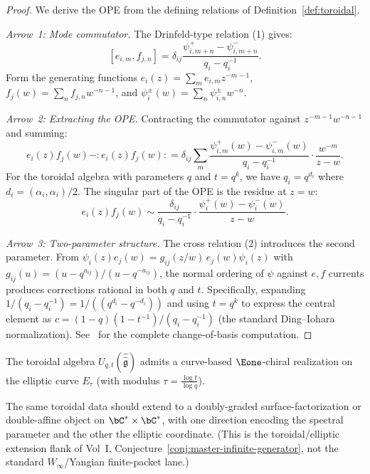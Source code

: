 \begin{proof}
We derive the OPE from the defining relations of Definition~\ref{def:toroidal}.

\emph{Arrow~1: Mode commutator.}
The Drinfeld-type relation (1) gives:
\[
[e_{i,m}, f_{j,n}] = \delta_{ij} \frac{\psi^+_{i,m+n} - \psi^-_{i,m+n}}{q_i - q_i^{-1}}.
\]
Form the generating functions $e_i(z) = \sum_m e_{i,m} z^{-m-1}$,
$f_j(w) = \sum_n f_{j,n} w^{-n-1}$, and
$\psi_i^\pm(w) = \sum_n \psi^\pm_{i,n} w^{-n}$.

\emph{Arrow~2: Extracting the OPE.}
Contracting the commutator against $z^{-m-1} w^{-n-1}$ and summing:
\[
e_i(z) f_j(w) - {:}e_i(z) f_j(w){:}
= \delta_{ij} \sum_{m} \frac{\psi^+_{i,m}(w) - \psi^-_{i,m}(w)}{q_i - q_i^{-1}} \cdot \frac{w^{-m}}{z - w}.
\]
For the toroidal algebra with parameters $q$ and $t = q^k$,
we have $q_i = q^{d_i}$ where $d_i = (\alpha_i, \alpha_i)/2$.
The singular part of the OPE is the residue at $z = w$:
\[
e_i(z) f_j(w) \sim \frac{\delta_{ij}}{q_i - q_i^{-1}} \cdot
\frac{\psi_i^+(w) - \psi_i^-(w)}{z - w}.
\]

\emph{Arrow~3: Two-parameter structure.}
The cross relation (2) introduces the second parameter.
From $\psi_i(z) e_j(w) = g_{ij}(z/w) \, e_j(w) \psi_i(z)$
with $g_{ij}(u) = (u - q^{a_{ij}})/(u - q^{-a_{ij}})$,
the normal ordering of $\psi$ against $e, f$ currents produces
corrections rational in both $q$ and $t$. Specifically, expanding
$1/(q_i - q_i^{-1}) = 1/((q^{d_i} - q^{-d_i}))$ and using
$t = q^k$ to express the central element as
$c = (1 - q)(1-t^{-1})/(q_i - q_i^{-1})$ (the standard Ding--Iohara
normalization). See~\cite{DI97} for the complete change-of-basis computation.
\end{proof}

\begin{conjecture}\label{conj:toroidal-e1}
\ClaimStatusConjectured
The toroidal algebra $U_{q,t}(\hat{\hat{\mathfrak{g}}})$ admits a
curve-based $\Eone$-chiral realization on the elliptic curve
$E_\tau$ (with modulus $\tau = \frac{\log t}{\log q}$).
\end{conjecture}

\begin{conjecture}
\label{conj:toroidal-surface-factorization}
\ClaimStatusConjectured
The same toroidal data should extend to a doubly-graded
surface-factorization or double-affine object on
$\bC^* \times \bC^*$, with one direction encoding the spectral
parameter and the other the elliptic coordinate.
(This is the toroidal/elliptic extension flank of
Vol~I, Conjecture~\ref{conj:master-infinite-generator}, not the standard
$W_\infty$/Yangian finite-packet lane.)
\end{conjecture}

